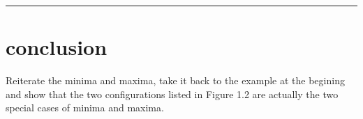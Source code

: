 \documentclass[
]{article}
\begin{document}
\begin{center}\rule{0.5\linewidth}{0.5pt}\end{center}

\hypertarget{conclusion}{%
\section{conclusion}\label{conclusion}}

Reiterate the minima and maxima, take it back to the example at the
begining and show that the two configurations listed in Figure 1.2 are
actually the two special cases of minima and maxima.
\end{document}
